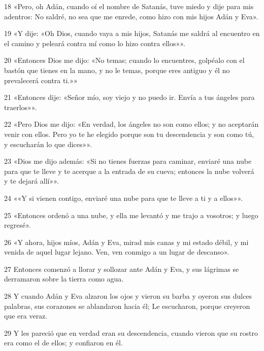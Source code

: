\par 18 «Pero, oh Adán, cuando oí el nombre de Satanás, tuve miedo y dije para mis adentros: No saldré, no sea que me enrede, como hizo con mis hijos Adán y Eva».

\par 19 «Y dije: «Oh Dios, cuando vaya a mis hijos, Satanás me saldrá al encuentro en el camino y peleará contra mí como lo hizo contra ellos»».

\par 20 «Entonces Dios me dijo: «No temas; cuando lo encuentres, golpéalo con el bastón que tienes en la mano, y no le temas, porque eres antiguo y él no prevalecerá contra ti.»»

\par 21 «Entonces dije: «Señor mío, soy viejo y no puedo ir. Envía a tus ángeles para traerlos»».

\par 22 «Pero Dios me dijo: «En verdad, los ángeles no son como ellos; y no aceptarán venir con ellos. Pero yo te he elegido porque son tu descendencia y son como tú, y escucharán lo que dices»».

\par 23 «Dios me dijo además: «Si no tienes fuerzas para caminar, enviaré una nube para que te lleve y te acerque a la entrada de su cueva; entonces la nube volverá y te dejará allí»».

\par 24 ««Y si vienen contigo, enviaré una nube para que te lleve a ti y a ellos»».

\par 25 «Entonces ordenó a una nube, y ella me levantó y me trajo a vosotros; y luego regresé».

\par 26 «Y ahora, hijos míos, Adán y Eva, mirad mis canas y mi estado débil, y mi venida de aquel lugar lejano. Ven, ven conmigo a un lugar de descanso».

\par 27 Entonces comenzó a llorar y sollozar ante Adán y Eva, y sus lágrimas se derramaron sobre la tierra como agua.

\par 28 Y cuando Adán y Eva alzaron los ojos y vieron su barba y oyeron sus dulces palabras, sus corazones se ablandaron hacia él; Le escucharon, porque creyeron que era veraz.

\par 29 Y les pareció que en verdad eran su descendencia, cuando vieron que su rostro era como el de ellos; y confiaron en él.

